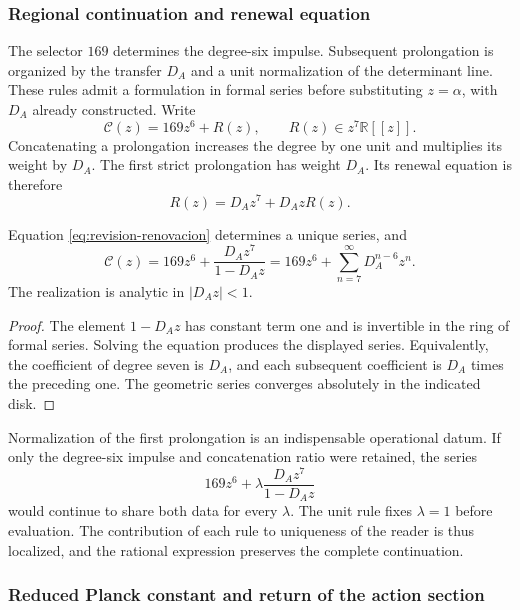 \subsubsection{Regional continuation and renewal equation}

The selector \(169\) determines the degree-six impulse. Subsequent
prolongation is organized by the transfer \(D_A\) and a unit
normalization of the determinant line. These rules admit a formulation
in formal series before substituting \(z=\alpha\), with \(D_A\) already
constructed. Write
\[
 \mathscr C(z)=169z^6+R(z),\qquad R(z)\in z^7\mathbb R[[z]].
\]
Concatenating a prolongation increases the degree by one unit and
multiplies its weight by \(D_A\). The first strict prolongation has
weight \(D_A\). Its renewal equation is therefore
\begin{equation}
 R(z)=D_Az^7+D_AzR(z).
 \label{eq:revision-renovacion}
\end{equation}

\begin{proposition}
Equation \eqref{eq:revision-renovacion} determines a unique series, and
\[
 \mathscr C(z)=169z^6+\frac{D_Az^7}{1-D_Az}
             =169z^6+\sum_{n=7}^{\infty}D_A^{n-6}z^n.
\]
The realization is analytic in \(|D_Az|<1\).
\end{proposition}
\begin{proof}
The element \(1-D_Az\) has constant term one and is invertible
in the ring of formal series. Solving the equation produces the displayed
series. Equivalently, the coefficient of degree seven is \(D_A\),
and each subsequent coefficient is \(D_A\) times the preceding one. The geometric
series converges absolutely in the indicated disk.
\end{proof}

Normalization of the first prolongation is an indispensable
operational datum. If only the degree-six impulse and
concatenation ratio were retained, the series
\[
 169z^6+\lambda\frac{D_Az^7}{1-D_Az}
\]
would continue to share both data for every \(\lambda\).
The unit rule fixes \(\lambda=1\) before evaluation.
The contribution of each rule to uniqueness of the reader is thus
localized, and the rational expression preserves the complete continuation.

\subsubsection{Reduced Planck constant and return of the action section}

